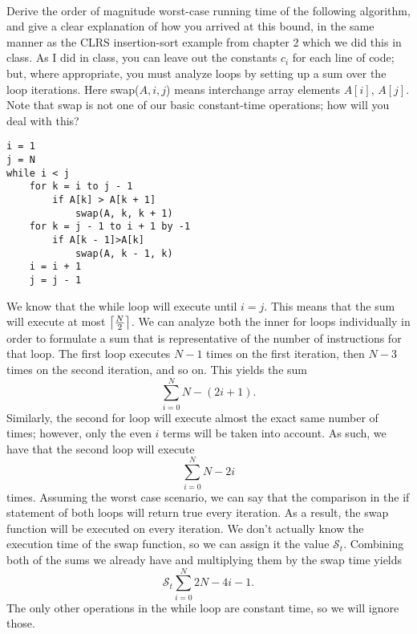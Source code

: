 \documentclass{hw}
\newcommand{\ceil}[1]{\left\lceil #1\right\rceil}
\begin{document}
\noindent\\

Derive the order of magnitude worst-case running time of the following algorithm, and give a clear
explanation of how you arrived at this bound, in the same manner as the CLRS insertion-sort example
from chapter 2 which we did this in class. As I did in class, you can leave out the constants
$c_{i}$ for each line of code; but, where appropriate, you must analyze loops by setting up a sum
over the loop iterations.
Here swap($A, i, j$) means interchange array elements $A[i]$, $A[j]$. Note that swap is not one of
our basic constant-time operations; how will you deal with this?\\

\begin{verbatim}
i = 1
j = N
while i < j
    for k = i to j - 1
        if A[k] > A[k + 1]
            swap(A, k, k + 1)
    for k = j - 1 to i + 1 by -1
        if A[k - 1]>A[k]
            swap(A, k - 1, k)
    i = i + 1
    j = j - 1
\end{verbatim}

We know that the while loop will execute until $i=j$. This means that the sum will execute at most
$\ceil{N \over 2}$. We can analyze both the inner for loops individually in order to formulate a
sum that is representative of the number of instructions for that loop. The first loop executes
$N-1$ times on the first iteration, then $N-3$ times on the second iteration, and so on. This
yields the sum
\[
\sum_{i=0}^{N} N-(2i+1).
\]
Similarly, the second for loop will execute almost the exact same number of times; however, only
the even $i$ terms will be taken into account. As such, we have that the second loop will execute
\[
\sum_{i=0}^{N} N-2i
\]
times. Assuming the worst case scenario, we can say that the comparison in the if statement of both
loops will return true every iteration. As a result, the swap function will be executed on every
iteration. We don't actually know the execution time of the swap function, so we can assign it the
value $\mathcal{S}_{t}$. Combining both of the sums we already have and multiplying them by the
swap time yields
\[
\mathcal{S}_{t}\sum_{i=0}^{N}2N-4i-1.
\]
The only other operations in the while loop are constant time, so we will ignore those.\\
\end{document}

